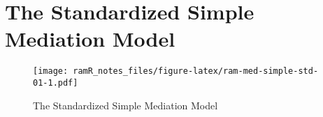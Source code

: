 \documentclass[
]{book}
\theoremstyle{definition}
\theoremstyle{definition}
\theoremstyle{definition}
\theoremstyle{remark}
\begin{document}
\hypertarget{ram-med-simple-std}{%
\chapter{The Standardized Simple Mediation Model}\label{ram-med-simple-std}}

\begin{figure}
\centering
\texttt{[image: ramR\_notes\_files/figure-latex/ram-med-simple-std-01-1.pdf]}
\caption{\label{fig:ram-med-simple-std-01}The Standardized Simple Mediation Model}
\end{figure}

  
\end{document}
